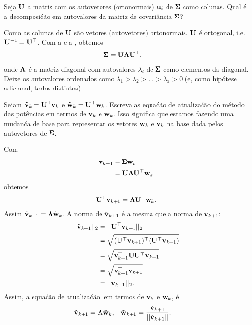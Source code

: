 \begin{exenumerate}
    \item Seja $\mathbf{U}$ a matriz com os autovetores (ortonormais) $\mathbf{u}_i$ de $\pmb{\Sigma}$ como colunas. Qual \'e a decomposi\'c\~ao em autovalores da matriz de covari\^ancia $\pmb{\Sigma}$?
    
    \begin{solution}
        Como as colunas de $\mathbf{U}$ s\~ao vetores (autovetores) ortonormais, $\mathbf{U}$ \'e ortogonal, i.e.
        $\mathbf{U}^{-1} = \mathbf{U}^\top$. Com a  e a , obtemos
        \begin{align}
            \pmb{\Sigma} &= \mathbf{U}\mathbf{\Lambda} \mathbf{U}^\top,
        \end{align}
        onde $\mathbf{\Lambda}$ \'e a matriz diagonal com autovalores $\lambda_i$ de $\pmb{\Sigma}$ como elementos da diagonal. Deixe os autovalores ordenados como $\lambda_1 > \lambda_2 > \ldots > \lambda_n > 0$ (e, como hip\'otese adicional, todos distintos).
    \end{solution}
    
    
    \item Sejam $\tilde{\mathbf{v}}_{k}= \mathbf{U}^\top \mathbf{v}_k$ e $\tilde{\mathbf{w}}_{k}= \mathbf{U}^\top \mathbf{w}_k$. Escreva as equa\'c\~ao de atualiza\'c\~ao do m\'etodo das pot\^encias em termos de $\tilde{\mathbf{v}}_{k}$ e $\tilde{\mathbf{w}}_{k}$. Isso significa que estamos fazendo uma mudan\'ca de base para representar os vetores $\mathbf{w}_k$ e $\mathbf{v}_k$ na base dada pelos autovetores de $\pmb{\Sigma}$.
    
    \begin{solution}
        Com
        \begin{align}
            \mathbf{v}_{k+1} &= \pmb{\Sigma} \mathbf{w}_k \\
            & = \mathbf{U}\mathbf{\Lambda} \mathbf{U}^\top\mathbf{w}_k
        \end{align}
        obtemos
        \begin{align}
            \mathbf{U}^\top\mathbf{v}_{k+1} = \mathbf{\Lambda} \mathbf{U}^\top\mathbf{w}_k.
        \end{align}
        Assim $\tilde{\mathbf{v}}_{k+1} = \mathbf{\Lambda}\tilde{\mathbf{w}}_k$. A norma de $\tilde{\mathbf{v}}_{k+1}$ \'e a mesma que a norma de $\mathbf{v}_{k+1}$:
        \begin{align}
            ||\tilde{\mathbf{v}}_{k+1}||_2 &= ||\mathbf{U}^\top\mathbf{v}_{k+1}||_2 \\
            &= \sqrt{(\mathbf{U}^\top\mathbf{v}_{k+1})^\top(\mathbf{U}^\top\mathbf{v}_{k+1})} \\
            &= \sqrt{\mathbf{v}_{k+1}^\top \mathbf{U}\mathbf{U}^\top\mathbf{v}_{k+1}} \\
            &= \sqrt{\mathbf{v}_{k+1}^\top\mathbf{v}_{k+1}} \\
            &= ||\mathbf{v}_{k+1}||_2.
        \end{align}
        Assim, a equa\'c\~ao de atualiza\'c\~ao, em termos de $\tilde{\mathbf{v}}_{k}$ e $\tilde{\mathbf{w}}_k$, \'e
        \begin{align}
            \tilde{\mathbf{v}}_{k+1} &= \mathbf{\Lambda} \tilde{\mathbf{w}}_k, & \tilde{\mathbf{w}}_{k+1} &= \frac{\tilde{\mathbf{v}}_{k+1}}{||\tilde{\mathbf{v}}_{k+1}||}.
        \end{align}
        

\end{solution}
\end{exenumerate}
